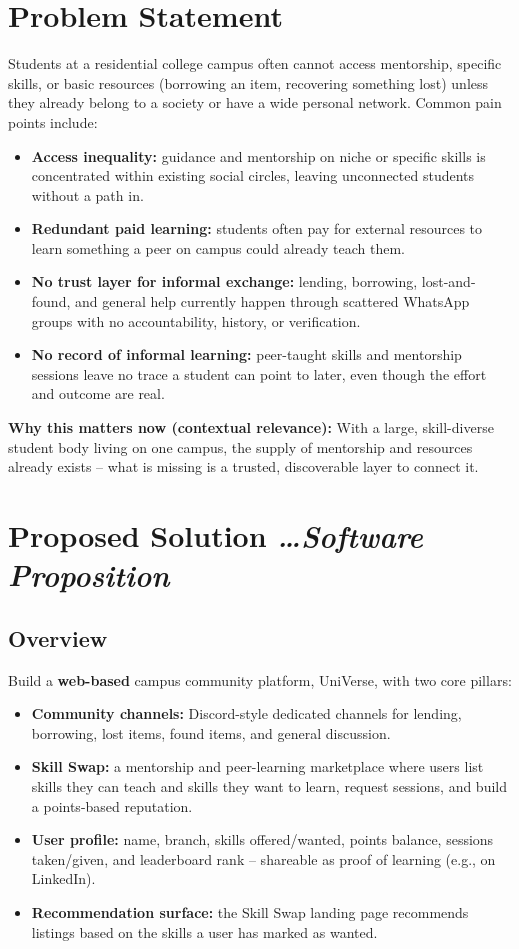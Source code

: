 \documentclass[11pt,a4paper]{article}
\newcommand{\BvrHint}[1]{%
  {\normalfont\normalsize\itshape\hfill #1}}
\begin{document}
\section{Problem Statement}
Students at a residential college campus often cannot access mentorship, specific skills, or basic resources (borrowing an item, recovering something lost) unless they already belong to a society or have a wide personal network. Common pain points include:
\begin{itemize}[leftmargin=0.7cm]
    \item \textbf{Access inequality:} guidance and mentorship on niche or specific skills is concentrated within existing social circles, leaving unconnected students without a path in.
    \item \textbf{Redundant paid learning:} students often pay for external resources to learn something a peer on campus could already teach them.
    \item \textbf{No trust layer for informal exchange:} lending, borrowing, lost-and-found, and general help currently happen through scattered WhatsApp groups with no accountability, history, or verification.
    \item \textbf{No record of informal learning:} peer-taught skills and mentorship sessions leave no trace a student can point to later, even though the effort and outcome are real.
\end{itemize}

\textbf{Why this matters now (contextual relevance):} With a large, skill-diverse student body living on one campus, the supply of mentorship and resources already exists -- what is missing is a trusted, discoverable layer to connect it.

\section{Proposed Solution %
\BvrHint{\ldots Software Proposition}}
\subsection{Overview}
Build a \textbf{web-based} campus community platform, UniVerse, with two core pillars:
\begin{itemize}[leftmargin=0.7cm]
    \item \textbf{Community channels:} Discord-style dedicated channels for lending, borrowing, lost items, found items, and general discussion.
    \item \textbf{Skill Swap:} a mentorship and peer-learning marketplace where users list skills they can teach and skills they want to learn, request sessions, and build a points-based reputation.
    \item \textbf{User profile:} name, branch, skills offered/wanted, points balance, sessions taken/given, and leaderboard rank -- shareable as proof of learning (e.g., on LinkedIn).
    \item \textbf{Recommendation surface:} the Skill Swap landing page recommends listings based on the skills a user has marked as wanted.
\end{itemize}
\end{document}
